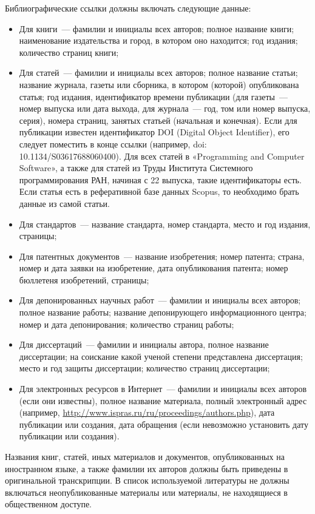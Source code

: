 \documentclass{ProcISPRAS}
\begin{document}
Библиографические ссылки должны включать следующие данные:
\begin{itemize}
  \item Для книги~--- фамилии и инициалы всех авторов; полное название книги;
    наименование издательства и город, в котором оно находится; год издания;
    количество страниц книги;
  \item Для статей~--- фамилии и инициалы всех авторов; полное название статьи;
    название журнала, газеты или сборника, в котором (которой) опубликована
    статья; год издания, идентификатор времени публикации (для газеты~--- номер
    выпуска или дата выхода, для журнала~--- год, том или номер выпуска, серия),
    номера страниц, занятых статьей (начальная и конечная). Если для публикации
    известен идентификатор DOI (Digital Object Identifier), его следует
    поместить в конце ссылки (например, doi: 10.1134/S03617688060400). Для всех
    статей в «Programming and Computer Software», а также для статей из Труды
    Института Системного программирования РАН, начиная с 22 выпуска, такие
    идентификаторы есть. Если статья есть в реферативной базе данных Scopus, то
    необходимо брать данные из самой статьи.
  \item Для стандартов~--- название стандарта, номер стандарта, место и год
    издания, страницы;
  \item Для патентных документов~--- название изобретения; номер патента;
    страна, номер и дата заявки на изобретение, дата опубликования патента;
    номер бюллетеня изобретений, страницы;
  \item Для депонированных научных работ~--- фамилии и инициалы всех авторов;
    полное название работы; название депонирующего информационного центра; номер
    и дата депонирования; количество страниц работы;
  \item Для диссертаций~--- фамилии и инициалы автора, полное название
    диссертации; на соискание какой ученой степени представлена диссертация;
    место и год защиты диссертации; количество страниц диссертации;
  \item Для электронных ресурсов в Интернет~--- фамилии и инициалы всех авторов
    (если они известны), полное название материала, полный электронный адрес
    (например, \url{http://www.ispras.ru/ru/proceedings/authors.php}), дата
    публикации или создания, дата обращения (если невозможно установить дату
    публикации или создания).
\end{itemize}

Названия книг, статей, иных материалов и документов, опубликованных на
иностранном языке, а также фамилии их авторов должны быть приведены в
оригинальной транскрипции. В список используемой литературы не должны включаться
неопубликованные материалы или материалы, не находящиеся в общественном доступе.
\end{document}
